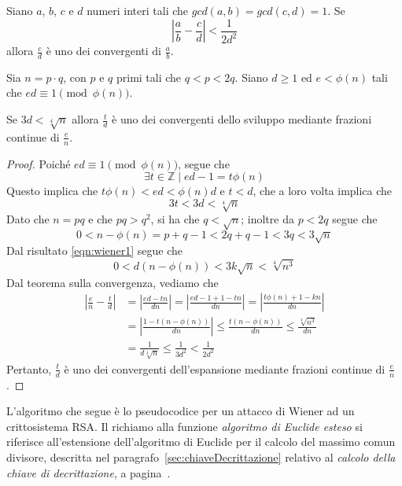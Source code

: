 \begin{teorema}
	Siano $a$, $b$, $c$ e $d$ numeri interi tali che $gcd(a,b) = gcd(c, d) = 1$. Se \[ \left| \frac{a}{b} - \frac{c}{d} \right| < \frac{1}{2d^2} \] allora $\frac{c}{d}$ è uno dei convergenti di $\frac{a}{b}$.
\end{teorema}

\begin{teorema}
	Sia $n = p \cdot q$, con $p$ e $q$ primi tali che $q < p < 2q$.
	Siano $d \geq 1$ ed $e < \phi(n)$ tali che $ed \equiv 1 \pmod{\phi(n)}$.

	Se $3d < \sqrt[4]{n}$ allora $\frac{t}{d}$ è uno dei convergenti dello sviluppo mediante frazioni continue di $\frac{e}{n}$.
\end{teorema}

\begin{proof}
	Poiché $ed \equiv 1 \pmod{\phi(n)}$, segue che \[ \exists t \in \mathbb{Z} \;|\; ed - 1 = t\phi(n) \]
	Questo implica che $t\phi(n) < ed < \phi(n)d$ e $t < d$, che a loro volta implica che
	\begin{equation}
		\label{eqn:wiener1}
		3t < 3d < \sqrt[4]{n}
	\end{equation}
	Dato che $n = pq$ e che $pq > q^2$, si ha che $q < \sqrt{n}$; inoltre da $p < 2q$ segue che \[ 0 < n - \phi(n) = p + q - 1 < 2q + q - 1 < 3q < 3\sqrt{n} \]
	Dal risultato \eqref{eqn:wiener1} segue che \[ 0 < d\left( n - \phi(n) \right) < 3k\sqrt{n} < \sqrt[4]{n^3} \]
	Dal teorema sulla convergenza, vediamo che 
	\begin{align*}
		\left| \frac{e}{n} - \frac{t}{d} \right| &= \left| \frac{ed - tn}{dn} \right| = \left| \frac{ed - 1 + 1 - tn}{dn} \right| = \left| \frac{t\phi(n) + 1 - kn}{dn} \right| \\
		&= \left| \frac{1 - t\left( n - \phi(n) \right)}{dn} \right| \leq \frac{t\left( n - \phi(n) \right)}{dn} \leq \frac{\sqrt[4]{n^3}}{dn} \\
		&= \frac{1}{d\sqrt[4]{n}} \leq \frac{1}{3d^2} < \frac{1}{2d^2}
	\end{align*}
	Pertanto, $\frac{t}{d}$ è uno dei convergenti dell'espansione mediante frazioni continue di $\frac{e}{n}$.
\end{proof}

L'algoritmo che segue è lo pseudocodice per un attacco di Wiener ad un crittosistema RSA. Il richiamo alla funzione \emph{algoritmo di Euclide esteso} si riferisce all'estensione dell'algoritmo di Euclide per il calcolo del massimo comun divisore, descritta nel paragrafo~\ref{sec:chiaveDecrittazione} relativo al \emph{calcolo della chiave di decrittazione}, a pagina~\pageref{sec:chiaveDecrittazione}.


